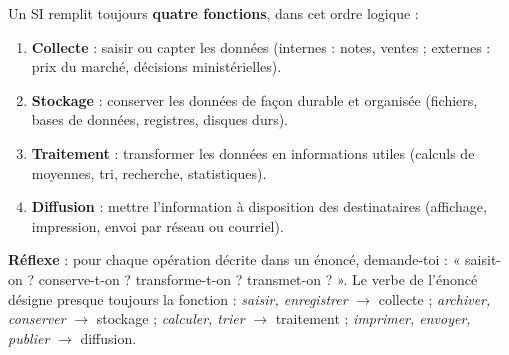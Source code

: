 \documentclass[11pt]{article}
\begin{document}
\begin{methode}
Un SI remplit toujours \textbf{quatre fonctions}, dans cet ordre logique :
\begin{enumerate}
\item \textbf{Collecte} : saisir ou capter les données (internes : notes, ventes ; externes : prix du marché, décisions ministérielles).
\item \textbf{Stockage} : conserver les données de façon durable et organisée (fichiers, bases de données, registres, disques durs).
\item \textbf{Traitement} : transformer les données en informations utiles (calculs de moyennes, tri, recherche, statistiques).
\item \textbf{Diffusion} : mettre l'information à disposition des destinataires (affichage, impression, envoi par réseau ou courriel).
\end{enumerate}
\textbf{Réflexe} : pour chaque opération décrite dans un énoncé, demande-toi : « saisit-on ? conserve-t-on ? transforme-t-on ? transmet-on ? ». Le verbe de l'énoncé désigne presque toujours la fonction : \emph{saisir, enregistrer} $\to$ collecte ; \emph{archiver, conserver} $\to$ stockage ; \emph{calculer, trier} $\to$ traitement ; \emph{imprimer, envoyer, publier} $\to$ diffusion.
\end{methode}
\end{document}
